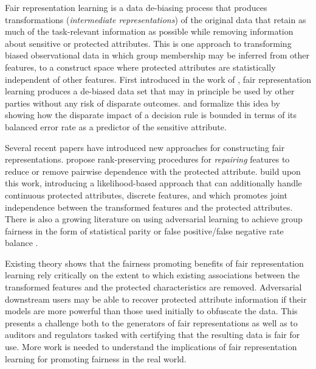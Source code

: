 Fair representation learning is a data de-biasing process that produces transformations (\textit{intermediate representations}) of the original data that retain as much of the task-relevant information as possible while removing information about sensitive or protected attributes.
This is one approach to transforming biased observational data in which group membership may be inferred from other features, to a construct space where protected attributes are statistically independent of other features.
First introduced in the work of \cite{zemel2013learning}, fair representation learning produces a de-biased data set that may in principle be used by other parties without any risk of disparate outcomes.  \cite{feldman2015certifying} and \cite{mcnamara2017provably} formalize this idea by showing how the disparate impact of a decision rule is bounded in terms of its balanced error rate as a predictor of the sensitive attribute.

Several recent papers have introduced new approaches for constructing fair representations.   \cite{feldman2015certifying} propose rank-preserving procedures for \textit{repairing} features to reduce or remove pairwise dependence with the protected attribute.  \cite{johndrow2017algorithm} build upon this work, introducing a likelihood-based approach that can additionally handle continuous protected attributes, discrete features, and which promotes joint independence between the transformed features and the protected attributes.  There is also a growing literature on using adversarial learning to achieve group fairness in the form of statistical parity or false positive/false negative rate balance \cite{edwards2015censoring,beutel2017data,zhang2018mitigating,madras2018learning}.

Existing theory shows that the fairness promoting benefits of fair representation learning rely critically on the extent to which existing associations between the transformed features and the protected characteristics are removed.  Adversarial downstream users may be able to recover protected attribute information if their models are more powerful than those used initially to obfuscate the data.  This presents a challenge both to the generators of fair representations as well as to auditors and regulators tasked with certifying that the resulting data is fair for use.
More work is needed to understand the implications of fair representation learning for promoting fairness in the real world.

